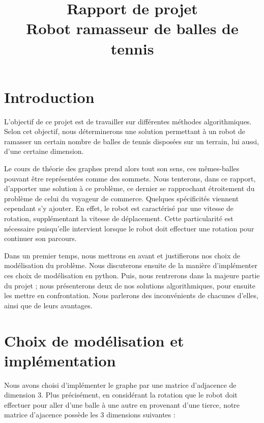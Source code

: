 \documentclass[12pt]{article}
\title{Rapport de projet \\ \textbf{Robot ramasseur de balles de tennis}}
\author{}
\date{}
\begin{document}
    \begin{titlepage}

        \begin{figure}
            \centering
        \end{figure}
        \maketitle

    \end{titlepage}

    \tableofcontents
    \pagebreak
    
    \section{Introduction}
    \label{sec:intro}

    L'objectif de ce projet est de travailler sur différentes méthodes algorithmiques. Selon cet objectif, nous déterminerons une solution permettant à un robot de ramasser un certain nombre de balles de tennis disposées sur un terrain, lui aussi, d'une certaine dimension.

    Le cours de théorie des graphes prend alors tout son sens, ces mêmes-balles pouvant être représentées comme des sommets. Nous tenterons, dans ce rapport, d'apporter une solution à ce problème, ce dernier se rapprochant étroitement du problème de celui du voyageur de commerce.
    Quelques spécificités viennent cependant s'y ajouter. En effet, le robot est caractérisé par une vitesse de rotation, supplémentant la vitesse de déplacement. Cette particularité est nécessaire puisqu'elle intervient lorsque le robot doit effectuer une rotation pour continuer son parcours.

    Dans un premier temps, nous mettrons en avant et justifierons nos choix de modélisation du problème. Nous discuterons ensuite de la manière d'implémenter ces choix de modélisation en python. Puis, nous rentrerons dans la majeure partie du projet ; nous présenterons deux de nos solutions algorithmiques, pour ensuite les mettre en confrontation. Nous parlerons des inconvénients de chacunes d'elles, ainsi que de leurs avantages.

    \section{Choix de modélisation et implémentation}
    \label{sec:model_impl}

    Nous avons choisi d'implémenter le graphe par une matrice d'adjacence de dimension 3. Plus précisément, en considérant la rotation que le robot doit effectuer pour aller d'une balle à une autre en provenant d'une tierce, notre matrice d'ajacence possède les 3 dimensions suivantes :
\end{document}

